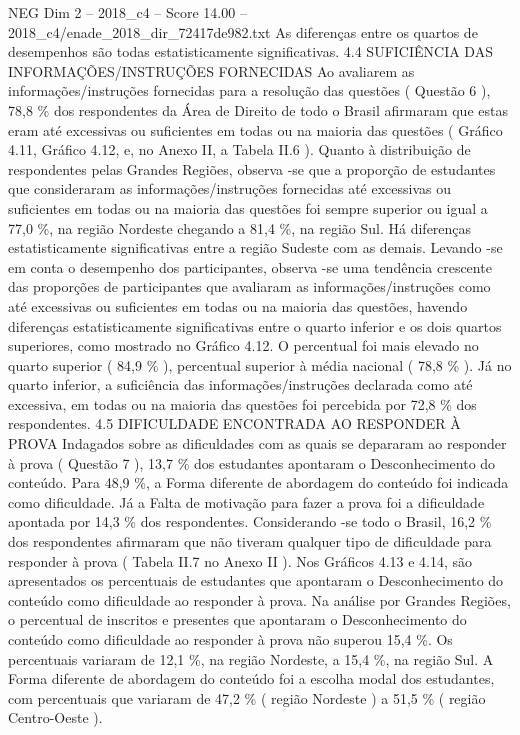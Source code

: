 \begin{textsample}{NEG Dim 2 – 2018\_c4 – Score 14.00 – 2018\_c4/enade\_2018\_dir\_72417de982.txt}
As diferenças entre os quartos de desempenhos são todas estatisticamente significativas. 4.4 SUFICIÊNCIA DAS INFORMAÇÕES/INSTRUÇÕES FORNECIDAS Ao avaliarem as informações/instruções fornecidas para a resolução das questões ( Questão 6 ), 78,8 \% dos respondentes da Área de Direito de todo o Brasil afirmaram que estas eram até excessivas ou suficientes em todas ou na maioria das questões ( Gráfico 4.11, Gráfico 4.12, e, no Anexo II, a Tabela II.6 ).
Quanto à distribuição de respondentes pelas Grandes Regiões, observa -se que a proporção de estudantes que consideraram as informações/instruções fornecidas até excessivas ou suficientes em todas ou na maioria das questões foi sempre superior ou igual a 77,0 \%, na região Nordeste chegando a 81,4 \%, na região Sul.
Há diferenças estatisticamente significativas entre a região Sudeste com as demais.
Levando -se em conta o desempenho dos participantes, observa -se uma tendência crescente das proporções de participantes que avaliaram as informações/instruções como até excessivas ou suficientes em todas ou na maioria das questões, havendo diferenças estatisticamente significativas entre o quarto inferior e os dois quartos superiores, como mostrado no Gráfico 4.12.
O percentual foi mais elevado no quarto superior ( 84,9 \% ), percentual superior à média nacional ( 78,8 \% ).
Já no quarto inferior, a suficiência das informações/instruções declarada como até excessiva, em todas ou na maioria das questões foi percebida por 72,8 \% dos respondentes. 4.5 DIFICULDADE ENCONTRADA AO RESPONDER À PROVA Indagados sobre as dificuldades com as quais se depararam ao responder à prova ( Questão 7 ), 13,7 \% dos estudantes apontaram o Desconhecimento do conteúdo.
Para 48,9 \%, a Forma diferente de abordagem do conteúdo foi indicada como dificuldade.
Já a Falta de motivação para fazer a prova foi a dificuldade apontada por 14,3 \% dos respondentes.
Considerando -se todo o Brasil, 16,2 \% dos respondentes afirmaram que não tiveram qualquer tipo de dificuldade para responder à prova ( Tabela II.7 no Anexo II ).
Nos Gráficos 4.13 e 4.14, são apresentados os percentuais de estudantes que apontaram o Desconhecimento do conteúdo como dificuldade ao responder à prova.
Na análise por Grandes Regiões, o percentual de inscritos e presentes que apontaram o Desconhecimento do conteúdo como dificuldade ao responder à prova não superou 15,4 \%.
Os percentuais variaram de 12,1 \%, na região Nordeste, a 15,4 \%, na região Sul.
A Forma diferente de abordagem do conteúdo foi a escolha modal dos estudantes, com percentuais que variaram de 47,2 \% ( região Nordeste ) a 51,5 \% ( região Centro-Oeste ).

\end{textsample}
